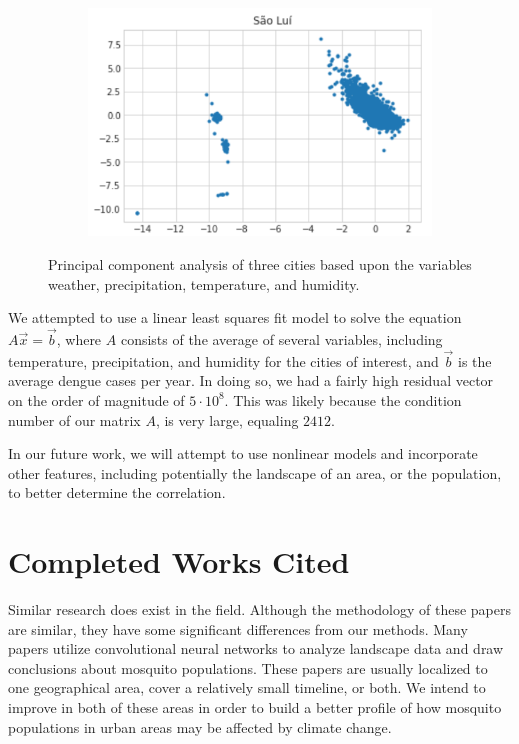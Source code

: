\documentclass[11pt]{article}
\begin{document}
\begin{figure}
	\hfill
	\begin{subfigure}[b]{0.3\textwidth}
		\centering
		\includegraphics[width=\textwidth]{sao}
	\end{subfigure}
	\caption{Principal component analysis of three cities based upon the variables weather, precipitation, temperature, and humidity.}
	\label{fig:three graphs}
\end{figure}

We attempted to use a linear least squares fit model to solve the equation $A\vec{x}=\vec{b}$, where $A$ consists of the average of several variables, including temperature, precipitation, and humidity for the cities of interest, and $\vec{b}$ is the average dengue cases per year. In doing so, we had a fairly high residual vector on the order of magnitude of $5\cdot 10^8$. This was likely because the condition number of our matrix $A$, is very large, equaling $2412$.

In our future work, we will attempt to use nonlinear models and incorporate other features, including potentially the landscape of an area, or the population, to better determine the correlation. 

\section{Completed Works Cited}
Similar research does exist in the field. Although the methodology of these papers are similar, they have some significant differences from our methods. Many papers utilize convolutional neural networks to analyze landscape data and draw conclusions about mosquito populations. These papers are usually localized to one geographical area, cover a relatively small timeline, or both. We intend to improve in both of these areas in order to build a better profile of how mosquito populations in urban areas may be affected by climate change.
\end{document}
